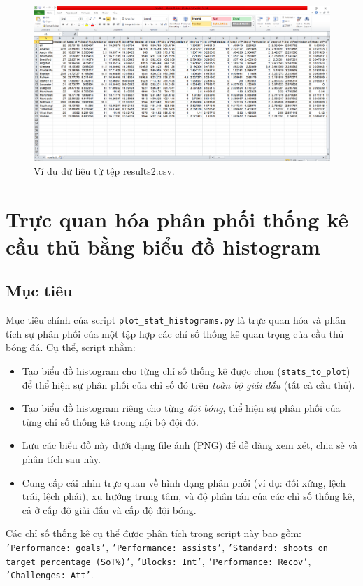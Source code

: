 \documentclass[12pt, a4paper]{report}
\begin{document}
\begin{figure}[H]
    \centering
    \includegraphics[width=\textwidth]{results2.png}
    \caption{Ví dụ dữ liệu từ tệp results2.csv.}
    \label{fig:results2_csv}
\end{figure}

\section{Trực quan hóa phân phối thống kê cầu thủ bằng biểu đồ histogram}

\subsection{Mục tiêu}
Mục tiêu chính của script \texttt{plot\_stat\_histograms.py} là trực quan hóa và phân tích sự phân phối của một tập hợp các chỉ số thống kê quan trọng của cầu thủ bóng đá.
Cụ thể, script nhằm:
\begin{itemize}
    \item Tạo biểu đồ histogram cho từng chỉ số thống kê được chọn (\texttt{stats\_to\_plot}) để thể hiện sự phân phối của chỉ số đó trên \textit{toàn bộ giải đấu} (tất cả cầu thủ).
    \item Tạo biểu đồ histogram riêng cho từng \textit{đội bóng}, thể hiện sự phân phối của từng chỉ số thống kê trong nội bộ đội đó.
    \item Lưu các biểu đồ này dưới dạng file ảnh (PNG) để dễ dàng xem xét, chia sẻ và phân tích sau này.
    \item Cung cấp cái nhìn trực quan về hình dạng phân phối (ví dụ: đối xứng, lệch trái, lệch phải), xu hướng trung tâm, và độ phân tán của các chỉ số thống kê, cả ở cấp độ giải đấu và cấp độ đội bóng.
\end{itemize}
Các chỉ số thống kê cụ thể được phân tích trong script này bao gồm: \texttt{'Performance: goals'}, \texttt{'Performance: assists'}, \texttt{'Standard: shoots on target percentage (SoT\%)'}, \texttt{'Blocks: Int'}, \texttt{'Performance: Recov'}, \texttt{'Challenges: Att'}.
\end{document}

